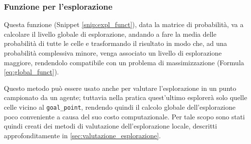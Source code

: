 \subsubsection{Funzione per l'esplorazione} \label{subsubsec:expl_funct}
Questa funzione (Snippet \ref{snip:expl_funct}), data la matrice di probabilità, va a calcolare il livello globale di esplorazione, andando a fare la media delle probabilità di tutte le celle e trasformando il risultato in modo che, ad una probabilità complessiva minore, venga associato un livello di esplorazione maggiore, rendendolo compatibile con un problema di massimizzazione (Formula \ref{eq:global_funct}).


Questo metodo può essere usato anche per valutare l'esplorazione in un punto campionato da un agente; tuttavia nella pratica quest'ultimo esplorerà solo quelle celle vicino al \texttt{goal\_point}, rendendo quindi il calcolo globale dell'esplorazione poco conveniente a causa del suo costo computazionale.
Per tale scopo sono stati quindi creati dei metodi di valutazione dell'esplorazione locale, descritti approfonditamente in \ref{sec:valutazione_esplorazione}.